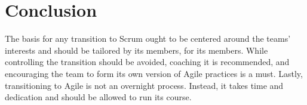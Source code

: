 \documentclass{scrartcl}
\begin{document}
    \section{Conclusion}
    
    The basis for any transition to Scrum ought to be centered around the teams' interests and should be tailored by its members, for its members. While controlling the transition should be avoided, coaching it is recommended, and encouraging the team to form its own version of Agile practices is a must. Lastly, transitioning to Agile is not an overnight process. Instead, it takes time and dedication and should be allowed to run its course.

\printbibliography
\end{document}
